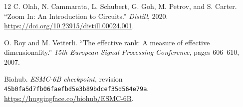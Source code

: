 \documentclass[11pt]{article}
\begin{document}
\begin{thebibliography}{12}
C. Olah, N. Cammarata, L. Schubert, G. Goh, M. Petrov, and S. Carter.
``Zoom In: An Introduction to Circuits.''
\textit{Distill}, 2020.
\url{https://doi.org/10.23915/distill.00024.001}.

O. Roy and M. Vetterli.
``The effective rank: A measure of effective dimensionality.''
\textit{15th European Signal Processing Conference}, pages 606--610, 2007.

Biohub.
\textit{ESMC-6B checkpoint}, revision
\texttt{45b0fa5d7fb06faefbd5e3b89bdcef35d564e79a}.
\url{https://huggingface.co/biohub/ESMC-6B}.

\end{thebibliography}
\end{document}
